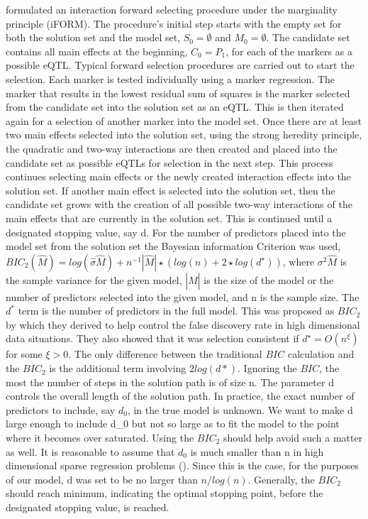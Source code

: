 \documentclass[11pt,]{book}
\theoremstyle{definition}
\theoremstyle{definition}
\theoremstyle{remark}
\begin{document}
\cite{hao2014interaction} formulated an interaction forward selecting
procedure under the marginality principle (iFORM). The procedure's
initial step starts with the empty set for both the solution set and the
model set, \(S_0=\emptyset\) and \(M_0=\emptyset\). The candidate set
contains all main effects at the beginning, \(C_0 = P_1\), for each of
the markers as a possible eQTL. Typical forward selection procedures are
carried out to start the selection. Each marker is tested individually
using a marker regression. The marker that results in the lowest
residual sum of squares is the marker selected from the candidate set
into the solution set as an eQTL. This is then iterated again for a
selection of another marker into the model set. Once there are at least
two main effects selected into the solution set, using the strong
heredity principle, the quadratic and two-way interactions are then
created and placed into the candidate set as possible eQTLs for
selection in the next step. This process continues selecting main
effects or the newly created interaction effects into the solution set.
If another main effect is selected into the solution set, then the
candidate set grows with the creation of all possible two-way
interactions of the main effects that are currently in the solution set.
This is continued until a designated stopping value, say d. For the
number of predictors placed into the model set from the solution set the
Bayesian information Criterion was used,
\(BIC_2(\hat{M})=log(\hat \sigma \hat M)+n^{-1} |\hat M|\star(log(n)+2\star log(d^\star))\),
where \(\sigma^2 \hat{M}\) is the sample variance for the given model,
\(|\hat{M}|\) is the size of the model or the number of predictors
selected into the given model, and n is the sample size. The \(d^*\)
term is the number of predictors in the full model. This was proposed as
\(BIC_2\) by \cite{chen2008extended} which they derived to help control
the false discovery rate in high dimensional data situations. They also
showed that it was selection consistent if \(d^\star = O(n^\xi)\) for
some \(\xi \gt 0\). The only difference between the traditional \(BIC\)
calculation and the \(BIC_2\) is the additional term involving
\(2log(d*)\). Ignoring the \(BIC\), the most the number of steps in the
solution path is of size n. The parameter d controls the overall length
of the solution path. In practice, the exact number of predictors to
include, say \(d_0\), in the true model is unknown. We want to make d
large enough to include d\_0 but not so large as to fit the model to the
point where it becomes over saturated. Using the \(BIC_2\) should help
avoid such a matter as well. It is reasonable to assume that \(d_0\) is
much smaller than n in high dimensional sparse regression problems
(\cite{fan2008sure}). Since this is the case, for the purposes of our
model, d was set to be no larger than \(n/log(n)\). Generally, the
\(BIC_2\) should reach minimum, indicating the optimal stopping point,
before the designated stopping value, is reached.
\end{document}
